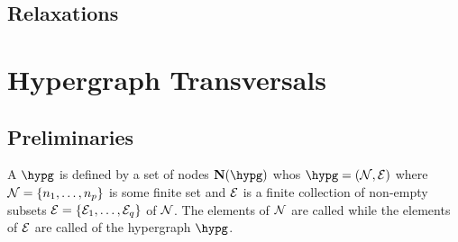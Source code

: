 \documentclass[aps, 10pt, english, twoside, twocolumn, pra, nofootinbib, tightenlines, longbibliography, superscriptaddress]{revtex4-1}
\begin{document}
    \subsection{Relaxations}

    \section{Hypergraph Transversals}
    \subsection{Preliminaries}
    \cite{Kavvadias_2005}
    \cite{Boros_2004}
    \cite{Boros_2002}
    \cite{Gainer_2017}
    \begin{definition}
        \label{def:hypergraph}
        A  $\hypg$ is defined by a set of nodes $\mathbf{N}\br{\hypg}$ whos $\hypg = \br{\nodes, \edges}$ where $\nodes = \bc{n_1, \ldots, n_p}$ is some finite set and $\mathcal{E}$ is a finite collection of non-empty subsets $\edges = \bc{\edges_{1}, \ldots, \edges_{q}}$ of $\mathcal{N}$. The elements of $\mathcal{N}$ are called  while the elements of $\mathcal{E}$ are called  of the hypergraph $\hypg$.
    \end{definition}
\end{document}
